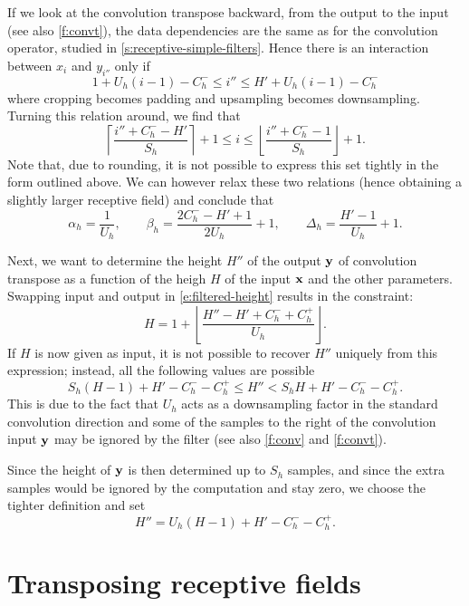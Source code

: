 If we look at the convolution transpose backward, from the output to the input (see also \cref{f:convt}), the data dependencies are the same as for the convolution operator, studied in \cref{s:receptive-simple-filters}. Hence there is an interaction between $x_i$ and $y_{i''}$ only if
\begin{equation}\label{e:convt-bounds}
   1 + U_h(i - 1) - C_h^- \leq i'' \leq H' + U_h(i - 1) - C_h^-
\end{equation}
where cropping becomes padding and upsampling becomes downsampling. Turning this relation around, we find that
\[
 \left\lceil \frac{i'' + C_h^- -H'}{S_h} \right\rceil + 1
 \leq
 i
 \leq
 \left\lfloor \frac{i'' + C_h^- - 1}{S_h} \right\rfloor + 1 .
\]
Note that, due to rounding, it is not possible to express this set tightly in the form outlined above. We can however relax these two relations (hence obtaining a slightly larger receptive field) and conclude that
\[
\alpha_h = \frac{1}{U_h},
\qquad
\beta_h = \frac{2C_h^- - H' + 1}{2 U_h} + 1,
\qquad
\Delta_h = \frac{H' -1}{U_h} + 1.
\]

Next, we want to determine the height $H''$ of the output $\mathbf{y}$ of convolution transpose as a function of the heigh $H$ of the input $\mathbf{x}$ and the other parameters. Swapping input and output in  \eqref{e:filtered-height} results in the constraint:
\[
H = 1+ \left\lfloor \frac{H'' - H' + C_h^- + C_h^+}{U_h} \right\rfloor.
\]
If $H$ is now given as input, it is not possible to recover $H''$ uniquely from this expression; instead, all the following values are possible
\[
   S_h (H-1) +H' -  C_h^- - C_h^+ \leq H'' < S_h H +H' -  C_h^- - C_h^+.
\]
This is due to the fact that $U_h$ acts as a downsampling factor in the standard convolution direction and some of the samples to the right of the convolution input $\mathbf{y}$ may be ignored by the filter (see also \cref{f:conv} and \cref{f:convt}).

Since the height of $\mathbf{y}$ is then determined up to $S_h$ samples, and since the extra samples would be ignored by the computation and stay zero, we choose the tighter definition and set
\[
H'' =  U_h (H-1) +H' -  C_h^- - C_h^+.
\]

\section{Transposing receptive fields}\label{s:receptive-transposing}

